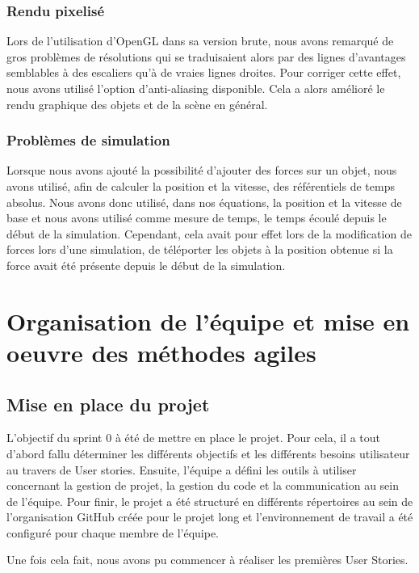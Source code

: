 \documentclass[11pt]{report}
\begin{document}
\subsection{Rendu pixelisé}

Lors de l'utilisation d'OpenGL dans sa version brute, nous avons remarqué de gros problèmes de résolutions qui se traduisaient alors
par des lignes d'avantages semblables à des escaliers qu'à de vraies lignes droites. Pour corriger cette effet, nous avons utilisé l'option
d'anti-aliasing disponible. Cela a alors amélioré le rendu graphique des objets et de la scène en général.

\subsection{Problèmes de simulation}

Lorsque nous avons ajouté la possibilité d'ajouter des forces sur un objet, nous avons utilisé, afin de calculer la position et la vitesse, des
référentiels de temps absolus. Nous avons donc utilisé, dans nos équations, la position et la vitesse de base et nous avons utilisé comme mesure
de temps, le temps écoulé depuis le début de la simulation. Cependant, cela avait pour effet lors de la modification de forces lors d'une
simulation, de téléporter les objets à la position obtenue si la force avait été présente depuis le début de la simulation.

\chapter{Organisation de l'équipe et mise en oeuvre des méthodes agiles}

\section{Mise en place du projet}
L'objectif du sprint 0 à été de mettre en place le projet. Pour cela, il a tout d'abord fallu
déterminer les différents objectifs et les différents besoins utilisateur au travers de User stories. Ensuite, l'équipe a défini
les outils à utiliser concernant la gestion de projet, la gestion du code et la communication au sein de l'équipe.
Pour finir, le projet a été structuré en différents répertoires au sein de l'organisation GitHub créée pour le projet long
et l'environnement de travail a été configuré pour chaque membre de l'équipe.\newline

Une fois cela fait, nous avons pu commencer à réaliser les premières User Stories.
\end{document}
